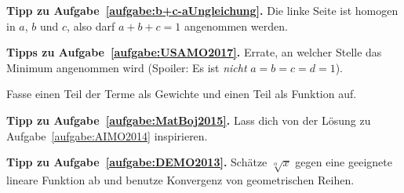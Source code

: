 \textbf{Tipp zu Aufgabe~\ref{aufgabe:b+c-aUngleichung}.} Die linke Seite ist homogen in $a$, $b$ und $c$, also darf $a+b+c=1$ angenommen werden.

\textbf{Tipps zu Aufgabe~\ref{aufgabe:USAMO2017}.} Errate, an welcher Stelle das Minimum angenommen wird (Spoiler: Es ist \emph{nicht} $a=b=c=d=1$).

Fasse einen Teil der Terme als Gewichte und einen Teil als Funktion auf.

\textbf{Tipp zu Aufgabe~\ref{aufgabe:MatBoj2015}.} Lass dich von der Lösung zu Aufgabe~\ref{aufgabe:AIMO2014} inspirieren.

\textbf{Tipp zu Aufgabe~\ref{aufgabe:DEMO2013}.} Schätze $\sqrt[\alpha]{x}$ gegen eine geeignete lineare Funktion ab und benutze Konvergenz von geometrischen Reihen.
